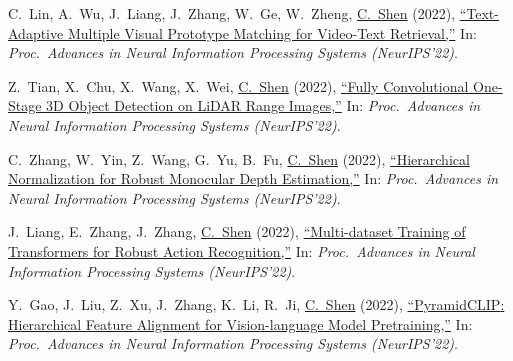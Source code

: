 \documentclass[9pt, a4paper]{article}
\newcommand{\years}[1]{\marginnote{\scriptsize #1}}
\def\highlight{\uline}
\begin{document}
\medskip

\years{2022} C.~Lin, A.~Wu, J.~Liang, J.~Zhang, W.~Ge, W.~Zheng, \highlight{C.~Shen} (2022),
\href{http://www.google.com/search?lr=&ie=UTF-8&oe=UTF-8&q=Text-Adaptive+Multiple+Visual+Prototype+Matching+for+Video-Text+Retrieval+Chengzhi+Lin%2C+Ancong+Wu%2C+Junwei+Liang%2C+Jun+Zhang%2C+Wenhang+Ge%2C+Wei-Shi+Zheng%2C+Chunhua+Shen}{``Text-Adaptive Multiple Visual Prototype Matching for Video-Text Retrieval,{}''}
In: \emph{Proc.\ Advances in Neural Information Processing Systems (NeurIPS'22)}.

\medskip

\years{2022} Z.~Tian, X.~Chu, X.~Wang, X.~Wei, \highlight{C.~Shen} (2022),
\href{http://www.google.com/search?lr=&ie=UTF-8&oe=UTF-8&q=Fully+Convolutional+One-Stage+3D+Object+Detection+on+LiDAR+Range+Images+Zhi+Tian%2C+Xiangxiang+Chu%2C+Xiaoming+Wang%2C+Xiaolin+Wei%2C+Chunhua+Shen}{``Fully Convolutional One-Stage {3D} Object Detection on {LiDAR} Range Images,{}''}
In: \emph{Proc.\ Advances in Neural Information Processing Systems (NeurIPS'22)}.

\medskip

\years{2022} C.~Zhang, W.~Yin, Z.~Wang, G.~Yu, B.~Fu, \highlight{C.~Shen} (2022),
\href{http://www.google.com/search?lr=&ie=UTF-8&oe=UTF-8&q=Hierarchical+Normalization+for+Robust+Monocular+Depth+Estimation+Chi+Zhang%2C+Wei+Yin%2C+Zhibin+Wang%2C+Gang+Yu%2C+Bin+Fu%2C+Chunhua+Shen}{``Hierarchical Normalization for Robust Monocular Depth Estimation,{}''}
In: \emph{Proc.\ Advances in Neural Information Processing Systems (NeurIPS'22)}.

\medskip

\years{2022} J.~Liang, E.~Zhang, J.~Zhang, \highlight{C.~Shen} (2022),
\href{http://www.google.com/search?lr=&ie=UTF-8&oe=UTF-8&q=Multi-dataset+Training+of+Transformers+for+Robust+Action+Recognition+Junwei+Liang%2C+Enwei+Zhang%2C+Jun+Zhang%2C+Chunhua+Shen}{``Multi-dataset Training of Transformers for Robust Action Recognition,{}''}
In: \emph{Proc.\ Advances in Neural Information Processing Systems (NeurIPS'22)}.

\medskip

\years{2022} Y.~Gao, J.~Liu, Z.~Xu, J.~Zhang, K.~Li, R.~Ji, \highlight{C.~Shen} (2022),
\href{http://www.google.com/search?lr=&ie=UTF-8&oe=UTF-8&q=PyramidCLIP%3A+Hierarchical+Feature+Alignment+for+Vision-language+Model+Pretraining+Yuting+Gao%2C+Jinfeng+Liu%2C+Zihan+Xu%2C+Jun+Zhang%2C+Ke+Li%2C+Rongrong+Ji%2C+Chunhua+Shen}{``{PyramidCLIP}: Hierarchical Feature Alignment for Vision-language Model Pretraining,{}''}
In: \emph{Proc.\ Advances in Neural Information Processing Systems (NeurIPS'22)}.
\end{document}
